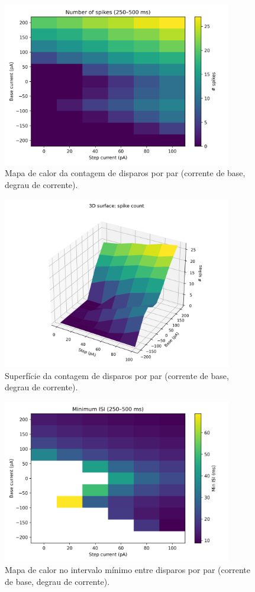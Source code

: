 \documentclass[english,11pt,a4paper]{article}
\begin{document}
	
	\begin{figure}[H]
	\centering
	\includegraphics[width=10cm]{../figures/ex_2b_spikecount_heatmap.png}	
	\caption{Mapa de calor da contagem de disparos por par (corrente de base, degrau de corrente).}
	\end{figure}
	\begin{figure}[H]
		\centering
		\includegraphics[width=10cm]{../figures/ex_2b_spikecount_surface.png}	
		\caption{Superfície da contagem de disparos por par (corrente de base, degrau de corrente).}
	\end{figure}
	\begin{figure}[H]
	\centering
	\includegraphics[width=10cm]{../figures/ex_2b_minISI_heatmap.png}	
	\caption{Mapa de calor no intervalo mínimo entre disparos por par (corrente de base, degrau de corrente).}
	\end{figure}
\end{document}
